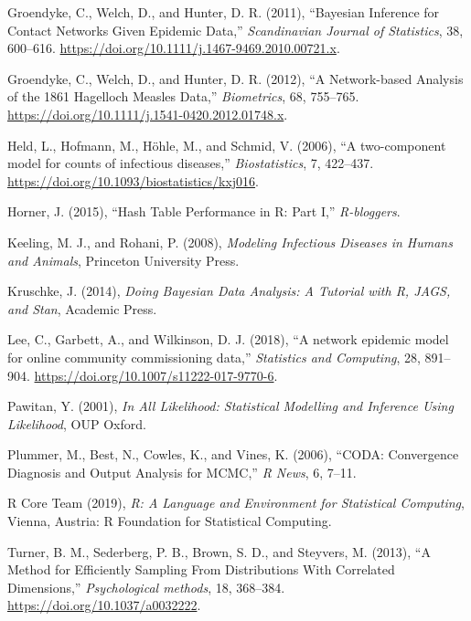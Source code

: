 \documentclass[11pt,a4paper]{article}
\begin{document}
\leavevmode\hypertarget{ref-groendyke_bayesian_2011}{}%
Groendyke, C., Welch, D., and Hunter, D. R. (2011), ``Bayesian Inference
for Contact Networks Given Epidemic Data,'' \emph{Scandinavian Journal
of Statistics}, 38, 600--616.
\url{https://doi.org/10.1111/j.1467-9469.2010.00721.x}.

\leavevmode\hypertarget{ref-groendyke_network-based_2012}{}%
Groendyke, C., Welch, D., and Hunter, D. R. (2012), ``A Network-based
Analysis of the 1861 Hagelloch Measles Data,'' \emph{Biometrics}, 68,
755--765. \url{https://doi.org/10.1111/j.1541-0420.2012.01748.x}.

\leavevmode\hypertarget{ref-held_two-component_2006}{}%
Held, L., Hofmann, M., Höhle, M., and Schmid, V. (2006), ``A
two-component model for counts of infectious diseases,''
\emph{Biostatistics}, 7, 422--437.
\url{https://doi.org/10.1093/biostatistics/kxj016}.

\leavevmode\hypertarget{ref-horner_hash_2015}{}%
Horner, J. (2015), ``Hash Table Performance in R: Part I,''
\emph{R-bloggers}.

\leavevmode\hypertarget{ref-keeling_modeling_2008}{}%
Keeling, M. J., and Rohani, P. (2008), \emph{Modeling Infectious
Diseases in Humans and Animals}, Princeton University Press.

\leavevmode\hypertarget{ref-kruschke_doing_2014}{}%
Kruschke, J. (2014), \emph{Doing Bayesian Data Analysis: A Tutorial with
R, JAGS, and Stan}, Academic Press.

\leavevmode\hypertarget{ref-lee_network_2018}{}%
Lee, C., Garbett, A., and Wilkinson, D. J. (2018), ``A network epidemic
model for online community commissioning data,'' \emph{Statistics and
Computing}, 28, 891--904.
\url{https://doi.org/10.1007/s11222-017-9770-6}.

\leavevmode\hypertarget{ref-pawitan_all_2001}{}%
Pawitan, Y. (2001), \emph{In All Likelihood: Statistical Modelling and
Inference Using Likelihood}, OUP Oxford.

\leavevmode\hypertarget{ref-plummer_coda:_2006}{}%
Plummer, M., Best, N., Cowles, K., and Vines, K. (2006), ``CODA:
Convergence Diagnosis and Output Analysis for MCMC,'' \emph{R News}, 6,
7--11.

\leavevmode\hypertarget{ref-r_core_team_r:_2019}{}%
R Core Team (2019), \emph{R: A Language and Environment for Statistical
Computing}, Vienna, Austria: R Foundation for Statistical Computing.

\leavevmode\hypertarget{ref-turner_method_2013}{}%
Turner, B. M., Sederberg, P. B., Brown, S. D., and Steyvers, M. (2013),
``A Method for Efficiently Sampling From Distributions With Correlated
Dimensions,'' \emph{Psychological methods}, 18, 368--384.
\url{https://doi.org/10.1037/a0032222}.
\end{document}
